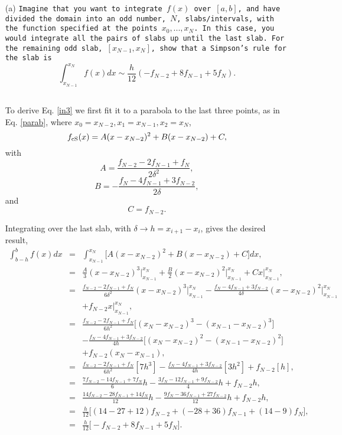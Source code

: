 \documentclass[11pt]{article}
\begin{document}
\begin{enumerate}

\item[(a)] {\color{MidnightBlue} \texttt{Imagine that you want to integrate $f(x)$ over $[a,b]$, and have divided the domain into an odd number, $N$, slabs/intervals, with the function specified at the points $x_0,...,x_N$. In this case, you would integrate all the pairs of slabs up until the last slab. For the remaining odd slab, $[x_{N-1},x_N]$, show that a Simpson's rule for the slab is\\
\begin{equation}
\int^{x_N}_{x_{N-1}} f(x) dx \sim \frac{h}{12}  (-f_{N-2} + 8f_{N-1} + 5f_N).
\label{in3}
\end{equation}
}}

\quad

To derive Eq. \ref{in3} we  first fit it to a parabola to the last three points, as in Eq. \ref{parab}, where $x_0=x_{N-2}, x_1=x_{N-1}, x_2=x_{N}$,
$$f_{\rm cS}(x) = A(x-x_{N-2})^2 + B(x-x_{N-2})+C,$$
with
$$A = \frac{f_{N-2} -2f_{N-1}+f_N}{2\delta^2}, $$
$$B = - \frac{f_N-4f_{N-1}+3f_{N-2}}{2 \delta}, $$
and
$$C = f_{N-2}.$$

\quad

Integrating over the last slab, with $\delta \rightarrow h = x_{i+1} - x_i$, gives the desired result,
\begin{eqnarray*}
\int^{b }_{  b-h } f(x) dx &=& \int^{x_N}_{x_{N-1}} \Big[A(x-x_{N-2})^2 + B(x-x_{N-2})+C \Big]dx,
\\
&=& \frac{A}{3}(x-x_{N-2})^3\Bigg|_{x_{N-1}}^{x_N} + \frac{B}{2} (x-x_{N-2})^2\Bigg|_{x_{N-1}}^{x_N} + Cx\Bigg|_{x_{N-1}}^{x_N},  
\\
&=& \frac{f_{N-2} -2f_{N-1}+f_N}{6\delta^2}(x-x_{N-2})^3\Bigg|_{x_{N-1}}^{x_N} - \frac{f_N-4f_{N-1}+3f_{N-2}}{4 \delta} (x-x_{N-2})^2\Bigg|_{x_{N-1}}^{x_N} \\
&& + f_{N-2}x\Bigg|_{x_{N-1}}^{x_N}	,
\\
&=& \frac{f_{N-2} -2f_{N-1}+f_N}{6h^2} \Bigg [(x_N-x_{N-2})^3 -  (x_{N-1}-x_{N-2})^3\Bigg ]\\
&& -\frac{f_{N}-4 f_{N-1}+3f_{N-2}}{4 h}  \Bigg [(x_N-x_{N-2})^2 -  (x_{N-1}-x_{N-2})^2\Bigg ]\\
&& + f_{N-2} ( x_N-x_{N-1} ),
\\
&=& \frac{f_{N-2} -2f_{N-1}+f_N}{6h^2}  [7h^3]-\frac{f_{N}-4 f_{N-1}+3f_{N-2}}{4 h}   [3h^2 ]+ f_{N-2} [h],
\\
&=& \frac{7f_{N-2} -14f_{N-1}+7f_N}{6}h-\frac{3f_{N}-12 f_{N-1}+9f_{N-2}}{4 }   h+ f_{N-2} h,
\\
&=& \frac{14f_{N-2} -28f_{N-1}+14f_N}{12}h-\frac{9f_{N}-36 f_{N-1}+27f_{N-2}}{12 }   h+ f_{N-2} h,
\\
&=& \frac{h}{12} \Big [(14-27+12)f_{N-2} + (-28+36)f_{N-1} +(14-9)f_N \Big] ,
\\
&=&  \frac{h}{12}  \Big[-f_{N-2} + 8f_{N-1} + 5f_N\Big].
\end{eqnarray*}


\end{enumerate}
\end{document}
